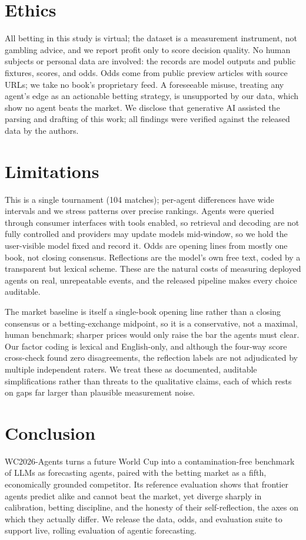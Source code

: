 \documentclass[sigconf,nonacm]{acmart}
\begin{document}
\section{Ethics}
All betting in this study is virtual; the dataset is a measurement instrument,
not gambling advice, and we report profit only to score decision quality. No
human subjects or personal data are involved: the records are model outputs and
public fixtures, scores, and odds. Odds come from public preview articles with
source URLs; we take no book's proprietary feed. A foreseeable misuse,
treating any agent's edge as an actionable betting strategy, is unsupported
by our data, which show no agent beats the market. We disclose that generative
AI assisted the parsing and drafting of this work; all findings were verified
against the released data by the authors.

\section{Limitations}
This is a single tournament (104 matches); per-agent differences have wide
intervals and we stress patterns over precise rankings. Agents were queried
through consumer interfaces with tools enabled, so retrieval and decoding are not
fully controlled and providers may update models mid-window, so we hold the
user-visible model fixed and record it. Odds are opening lines from mostly one
book, not closing consensus. Reflections are the model's own free text, coded by
a transparent but lexical scheme. These are the natural costs of measuring
deployed agents on real, unrepeatable events, and the released pipeline makes
every choice auditable.

The market baseline is itself a single-book opening line rather than a closing
consensus or a betting-exchange midpoint, so it is a conservative, not a maximal,
human benchmark; sharper prices would only raise the bar the agents must clear.
Our factor coding is lexical and English-only, and although the four-way score
cross-check found zero disagreements, the reflection labels are not adjudicated
by multiple independent raters. We treat these as documented, auditable
simplifications rather than threats to the qualitative claims, each of which
rests on gaps far larger than plausible measurement noise.

\section{Conclusion}
WC2026-Agents turns a future World Cup into a contamination-free benchmark of
LLMs as forecasting agents, paired with the betting market as a fifth,
economically grounded competitor. Its reference evaluation shows that frontier
agents predict alike and cannot beat the market, yet diverge sharply in
calibration, betting discipline, and the honesty of their self-reflection, the
axes on which they actually differ. We release the data, odds, and evaluation
suite to support live, rolling evaluation of agentic forecasting.
\end{document}
